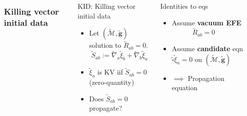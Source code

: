 \documentclass[10pt]{beamer}
\theoremstyle{plain}
\def\bmg{{\bm g}}
\begin{document}









\begin{frame}
\begin{columns}
\column{6.5cm}
\frametitle{Killing vector initial data}
\vspace{-5mm}
\begin{exampleblock}{KID: Killing vector initial data }
  \begin{itemize}
  \item Let $(\tilde{\mathcal{M}},\tilde{\bmg})$ solution to $\tilde{R}_{ab}=0$.
    \[\tilde{S}_{ab} := \tilde{\nabla}_{a}\tilde{\xi}_{b}+\tilde{\nabla}_{b}\tilde{\xi}_{a}\]
    \vspace{-5mm}
  \item $\tilde{\xi}_{a}$ is KV iif $\tilde{S}_{ab}=0$ (zero-quantity)
  \item Does $\tilde{S}_{ab}=0$ propagate?
  \end{itemize}
\end{exampleblock}
\vspace{-2mm}
\column{5.3cm}
\vspace{-5mm}
\begin{block}{Identities to eqs}
  \begin{itemize}
   \item Assume \textbf{vacuum EFE} $\qquad \quad \tilde{R}_{ab}=0$
   \item Assume \textbf{candidate} eqn $\tilde{\square}\tilde{\xi}_a=0$ on $(\tilde{\mathcal{M}},\tilde{\bmg})$
   \item  $\implies$ Propagation equation
     \vspace{-2mm}
     \[
\]
\end{itemize}
\end{block}
\end{columns}
\end{frame}
\end{document}
